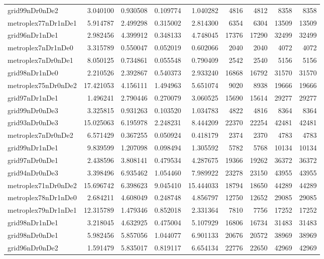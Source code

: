 \begin{longtable}{|l|r|r|r|r|r|r|r|r|}
grid99nDr0nDe2 & 3.040100 & 0.930508 & 0.109774 & 1.040282 & 4816 & 4812 & 8358 & 8358 \\
metroplex77nDr1nDe1 & 5.914787 & 2.499298 & 0.315002 & 2.814300 & 6354 & 6304 & 13509 & 13509 \\
grid96nDr1nDe1 & 2.982456 & 4.399912 & 0.348133 & 4.748045 & 17376 & 17290 & 32499 & 32499 \\
metroplex7nDr1nDe0 & 3.315789 & 0.550047 & 0.052019 & 0.602066 & 2040 & 2040 & 4072 & 4072 \\
metroplex7nDr0nDe1 & 8.050125 & 0.734861 & 0.055548 & 0.790409 & 2542 & 2540 & 5156 & 5156 \\
grid98nDr1nDe0 & 2.210526 & 2.392867 & 0.540373 & 2.933240 & 16868 & 16792 & 31570 & 31570 \\
metroplex75nDr0nDe2 & 17.421053 & 4.156111 & 1.494963 & 5.651074 & 9020 & 8938 & 19666 & 19666 \\
grid97nDr1nDe1 & 1.496241 & 2.790446 & 0.270079 & 3.060525 & 15690 & 15614 & 29277 & 29277 \\
grid99nDr0nDe3 & 3.325815 & 0.931263 & 0.103520 & 1.034783 & 4822 & 4816 & 8364 & 8364 \\
grid93nDr0nDe3 & 15.025063 & 6.195978 & 2.248231 & 8.444209 & 22370 & 22254 & 42481 & 42481 \\
metroplex7nDr0nDe2 & 6.571429 & 0.367255 & 0.050924 & 0.418179 & 2374 & 2370 & 4783 & 4783 \\
grid99nDr1nDe1 & 9.839599 & 1.207098 & 0.098494 & 1.305592 & 5782 & 5768 & 10134 & 10134 \\
grid97nDr0nDe1 & 2.438596 & 3.808141 & 0.479534 & 4.287675 & 19366 & 19262 & 36372 & 36372 \\
grid94nDr0nDe3 & 3.398496 & 6.935462 & 1.054460 & 7.989922 & 23278 & 23150 & 43955 & 43955 \\
metroplex71nDr0nDe2 & 15.696742 & 6.398623 & 9.045410 & 15.444033 & 18794 & 18650 & 44289 & 44289 \\
metroplex78nDr1nDe0 & 2.684211 & 4.608049 & 0.248748 & 4.856797 & 12750 & 12652 & 29085 & 29085 \\
metroplex79nDr1nDe1 & 12.315789 & 1.479346 & 0.852018 & 2.331364 & 7810 & 7756 & 17252 & 17252 \\
grid98nDr1nDe1 & 3.218045 & 4.632925 & 0.475004 & 5.107929 & 16806 & 16734 & 31483 & 31483 \\
grid98nDr0nDe1 & 5.982456 & 5.857056 & 1.044077 & 6.901133 & 20676 & 20572 & 38969 & 38969 \\
grid96nDr0nDe2 & 1.591479 & 5.835017 & 0.819117 & 6.654134 & 22776 & 22650 & 42969 & 42969 \\

\end{longtable}
